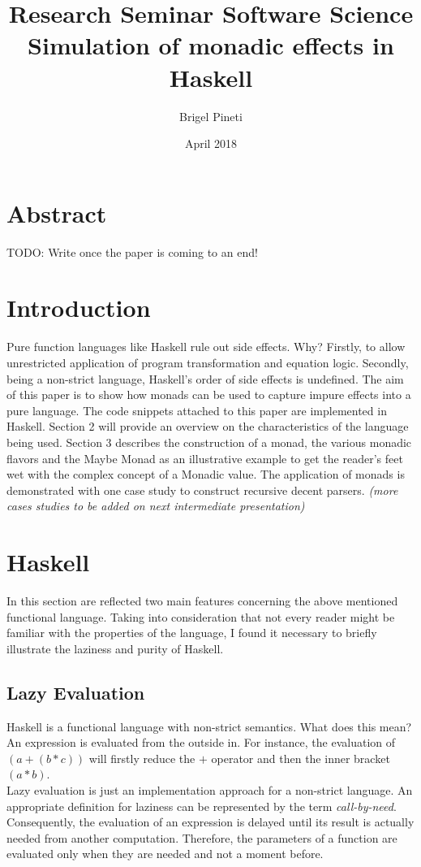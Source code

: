 \documentclass[a4paper, onecolumn]{article}
\title{\Large{Research Seminar Software Science} \\
    \huge{Simulation of monadic effects in Haskell}}
\author{Brigel Pineti}
\date{April 2018}
\begin{document}
    
    \maketitle
    
    \section*{Abstract}
    
    TODO: Write once the paper is coming to an end!
    
    \section{Introduction}
    
    Pure function languages like Haskell rule out side effects. Why? Firstly, to allow unrestricted application of program transformation and equation logic. Secondly, being a non-strict language, Haskell's order of side effects is undefined. The aim of this paper is to show how monads can be used to capture impure effects into a pure language. The code snippets attached to this paper are implemented in Haskell. Section 2 will provide an overview on the characteristics of the language being used. Section 3 describes the construction of a monad, the various monadic flavors and the Maybe Monad as an illustrative example to get the reader's feet wet with the complex concept of a Monadic value. The application of monads is demonstrated with one case study to construct recursive decent parsers. \textit{(more cases studies to be added on next intermediate presentation)} 
    
    \section{Haskell}
    
    In this section are reflected two main features concerning the above mentioned functional language. Taking into consideration that not every reader might be familiar with the properties of the language, I found it necessary to briefly illustrate the laziness and purity of Haskell.  
    
    \subsection{Lazy Evaluation}
    
    Haskell is a functional language with non-strict semantics. What does this mean? An expression is evaluated from the outside in. For instance, the evaluation of \textit{$(a + (b * c))$} will firstly reduce the \textit{$+$} operator and then the inner bracket \textit{$(a * b)$}. \\
    Lazy evaluation is just an implementation approach for a non-strict language. An appropriate definition for laziness can be represented by the term \textit{call-by-need}. Consequently, the evaluation of an expression is delayed until its result is actually needed from another computation. Therefore, the parameters of a function are evaluated only when they are needed and not a moment before.
    
\end{document}
